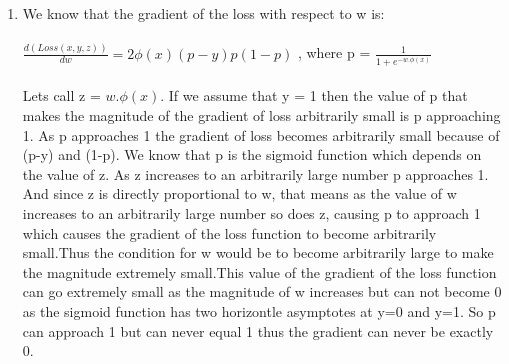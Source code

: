 \documentclass[12pt,letterpaper]{article}
\begin{document}
\begin{enumerate}
\begin{enumerate}
                    \item 
                    We know that the gradient of the loss with respect to w is: \\ \\
                    $\frac{d(Loss(x,y,z))}{dw} = 2\phi(x)(p-y)p(1-p)$ , where p = $\frac{1}{1+ e^{-w. \phi (x)}}$ \\ \\
                    Lets call z = $w. \phi (x)$. If we assume that y = 1 then the value of p that makes the magnitude of the gradient of loss arbitrarily small is p approaching 1. As p approaches 1 the gradient of loss becomes arbitrarily small because of (p-y) and (1-p). We know that p is the sigmoid function which depends on the value of z. As z increases to an arbitrarily large number p approaches 1. And since z is directly proportional to w, that means as the value of w increases to an arbitrarily large number so does z, causing p to approach 1 which causes the gradient of the loss function to become arbitrarily small.Thus the condition for w would be to become arbitrarily large to make the magnitude extremely small.This value of the gradient of the loss function can go extremely small as the magnitude of w increases but can not become 0 as the sigmoid function has two horizontle asymptotes at y=0 and y=1. So p can approach 1 but can never equal 1 thus the gradient can never be exactly 0. 
                    

\end{enumerate}
\end{enumerate}
\end{document}
